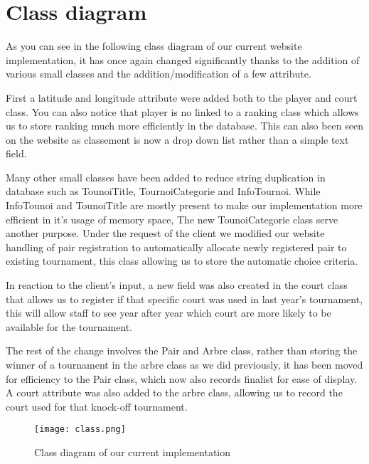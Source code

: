 \section{Class diagram}

As you can see in the following class diagram of our current website implementation, it has once again changed significantly thanks to the addition of various small classes and the addition/modification of a few attribute. \newline

First a latitude and longitude attribute were added both to the player and court class. You can also notice that player is no linked to a ranking class which allows us to store ranking much more efficiently in the database. This can also been seen on the website as classement is now a drop down list rather than a simple text field.\newline

Many other small classes have been added to reduce string duplication in database such as TounoiTitle, TournoiCategorie and InfoTournoi. While InfoTounoi and TounoiTitle are mostly present to make our implementation more efficient in it's usage of memory space, The new TounoiCategorie class serve another purpose. Under the request of the client we modified our website handling of pair registration to automatically allocate newly registered pair to existing tournament, this class allowing us to store the automatic choice criteria.\newline

In reaction to the client's input, a new field was also created in the court class that allows us to register if that specific court was used in last year's tournament, this will allow staff to see year after year which court are more likely to be available for the tournament. \newline

The rest of the change involves the Pair and Arbre class, rather than storing the winner of a tournament in the arbre class as we did previously, it has been moved for efficiency to the Pair class, which now also records finalist for ease of display. A court attribute was also added to the arbre class, allowing us to record the court used for that knock-off tournament.

\begin{figure}[!ht]
	\centering
	\texttt{[image: class.png]}
	\caption{Class diagram of our current implementation}
	\label{fig:length_eight_mouse}
\end{figure}
\FloatBarrier